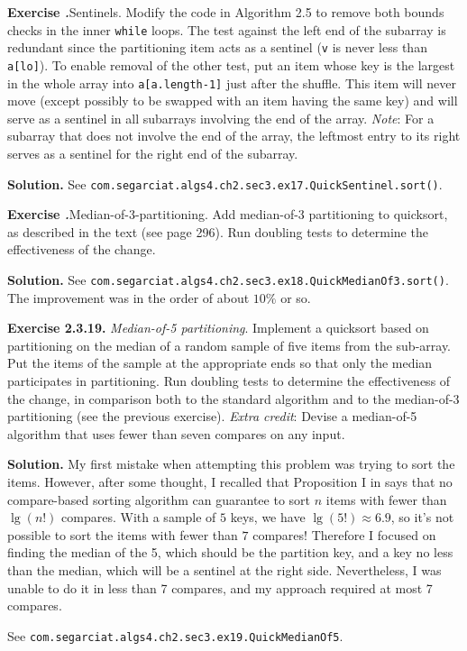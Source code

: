 \documentclass[12pt, a4paper]{article}
\newenvironment{ex}[2][Exercise]
{\par\medskip\noindent \textbf{#1 #2.}}
{\medskip}
\newenvironment{sol}[1][Solution]
{\par\medskip\noindent \textbf{#1.} }
{\medskip}
\begin{document}
	\begin{ex}{17}
		\emph{Sentinels}. Modify the code in Algorithm 2.5 to remove both bounds checks in the
		inner \texttt{while} loops. The test against the left end of the subarray is redundant
		since the partitioning item acts as a sentinel (\texttt{v} is never less than
		\texttt{a[lo]}). To enable removal of the other test, put an item whose key is the
		largest in the whole array into \texttt{a[a.length-1]} just after the shuffle. This
		item will  never move (except possibly to be swapped with an item having the same key)
		and will serve as a sentinel in all subarrays involving the end of the array.
		\emph{Note}: For a subarray that does not involve the end of the array, the leftmost
		entry to its right serves as a sentinel for the right end of the subarray.
	\end{ex}
	\begin{sol}
		See \texttt{com.segarciat.algs4.ch2.sec3.ex17.QuickSentinel.sort()}.
	\end{sol}
	\begin{ex}{18}
		\emph{Median-of-3-partitioning}. Add median-of-3 partitioning to quicksort, as described
		in the text (see page 296). Run doubling tests to determine the effectiveness of
		the change.
	\end{ex}
	\begin{sol}
		See \texttt{com.segarciat.algs4.ch2.sec3.ex18.QuickMedianOf3.sort()}.
		The improvement was in the order of about $10\%$ or so.
	\end{sol}
	\begin{ex}{2.3.19}
		\emph{Median-of-5 partitioning}. Implement a quicksort based on partitioning on
		the median of a random sample of five items from the sub-array. Put the items
		of the sample at the appropriate ends so that only the median participates in
		partitioning. Run doubling tests to determine the effectiveness of the change,
		in comparison both to the standard algorithm and to the median-of-3 partitioning
		(see the previous exercise). \emph{Extra credit}: Devise a median-of-5 algorithm
		that uses fewer than seven compares on any input.
	\end{ex}
	\begin{sol}
		My first mistake when attempting this problem was trying to sort the items.
		However, after some thought, I recalled that Proposition I in \cite{sedgewick_wayne}
		says that no compare-based sorting algorithm can guarantee to sort $n$ items
		with fewer than $\lg(n!)$ compares. With a sample of $5$ keys, we have
		$\lg(5!)\approx 6.9$, so it's not possible to sort the items with fewer
		than $7$ compares! Therefore I focused on finding the median of the 5, which should
		be the partition key, and a key no less than the median, which will be a sentinel
		at the right side. Nevertheless, I was unable to do it in less than 7 compares,
		and my approach required at most 7 compares.
		
		See \texttt{com.segarciat.algs4.ch2.sec3.ex19.QuickMedianOf5}.	
	\end{sol}
\end{document}
